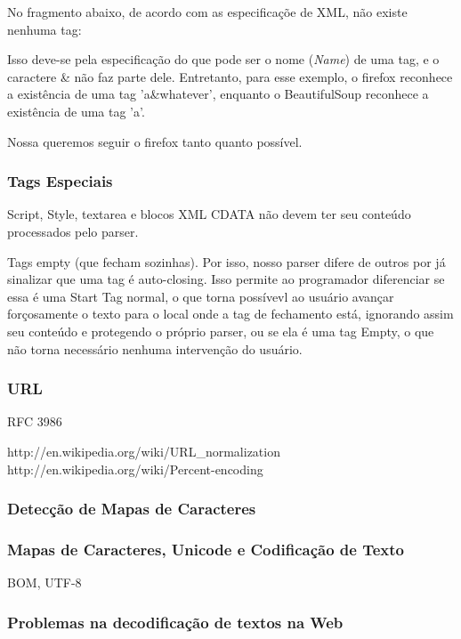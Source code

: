 \documentclass[10pt,twocolumn]{article}
\begin{document}
No fragmento abaixo, de acordo com as especificaçõe de XML, não existe nenhuma tag:

Isso deve-se pela especificação do que pode ser o nome (\emph{Name}) de uma
tag, e o caractere \& não faz parte dele. Entretanto, para esse exemplo, o
firefox reconhece a existência de uma tag 'a\&whatever', enquanto o
BeautifulSoup reconhece a existência de uma tag 'a'.

Nossa queremos seguir o firefox tanto quanto possível.

\subsubsection{Tags Especiais}

Script, Style, textarea e blocos XML CDATA não devem ter seu conteúdo
processados pelo parser.

Tags empty (que fecham sozinhas). Por isso, nosso parser difere de outros por
já sinalizar que uma tag é auto-closing. Isso permite ao programador
diferenciar se essa é uma Start Tag normal, o que torna possívevl ao usuário
avançar forçosamente o texto para o local onde a tag de fechamento está,
ignorando assim seu conteúdo e protegendo o próprio parser, ou se ela é uma tag
Empty, o que não torna necessário nenhuma intervenção do usuário.

\subsubsection{URL}

RFC 3986

http://en.wikipedia.org/wiki/URL\_normalization
http://en.wikipedia.org/wiki/Percent-encoding




\subsubsection{Detecção de Mapas de Caracteres}

\subsubsection{Mapas de Caracteres, Unicode e Codificação de Texto}
BOM, UTF-8

\subsubsection{Problemas na decodificação de textos na Web}
\end{document}
